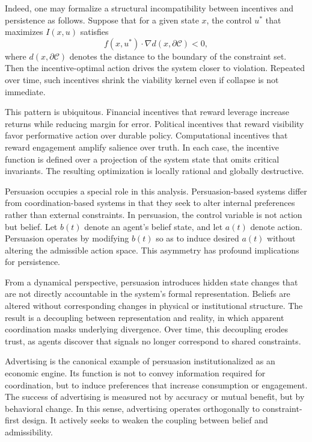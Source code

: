 \documentclass[12pt,oneside]{book}
\begin{document}
Indeed, one may formalize a structural incompatibility between incentives and persistence as follows. Suppose that for a given state \(x\), the control \(u^\ast\) that maximizes \(I(x,u)\) satisfies
\[
f(x,u^\ast) \cdot \nabla d(x,\partial \mathcal{C}) < 0,
\]
where \(d(x,\partial \mathcal{C})\) denotes the distance to the boundary of the constraint set. Then the incentive-optimal action drives the system closer to violation. Repeated over time, such incentives shrink the viability kernel even if collapse is not immediate.

This pattern is ubiquitous. Financial incentives that reward leverage increase returns while reducing margin for error. Political incentives that reward visibility favor performative action over durable policy. Computational incentives that reward engagement amplify salience over truth. In each case, the incentive function is defined over a projection of the system state that omits critical invariants. The resulting optimization is locally rational and globally destructive.

Persuasion occupies a special role in this analysis. Persuasion-based systems differ from coordination-based systems in that they seek to alter internal preferences rather than external constraints. In persuasion, the control variable is not action but belief. Let \(b(t)\) denote an agent's belief state, and let \(a(t)\) denote action. Persuasion operates by modifying \(b(t)\) so as to induce desired \(a(t)\) without altering the admissible action space. This asymmetry has profound implications for persistence.

From a dynamical perspective, persuasion introduces hidden state changes that are not directly accountable in the system's formal representation. Beliefs are altered without corresponding changes in physical or institutional structure. The result is a decoupling between representation and reality, in which apparent coordination masks underlying divergence. Over time, this decoupling erodes trust, as agents discover that signals no longer correspond to shared constraints.

Advertising is the canonical example of persuasion institutionalized as an economic engine. Its function is not to convey information required for coordination, but to induce preferences that increase consumption or engagement. The success of advertising is measured not by accuracy or mutual benefit, but by behavioral change. In this sense, advertising operates orthogonally to constraint-first design. It actively seeks to weaken the coupling between belief and admissibility.
\end{document}
